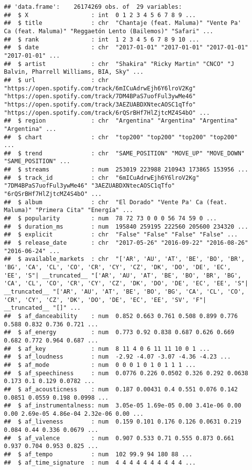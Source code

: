 \documentclass[
]{article}
\begin{document}
\begin{verbatim}
## 'data.frame':    26174269 obs. of  29 variables:
##  $ X                  : int  0 1 2 3 4 5 6 7 8 9 ...
##  $ title              : chr  "Chantaje (feat. Maluma)" "Vente Pa' Ca (feat. Maluma)" "Reggaetón Lento (Bailemos)" "Safari" ...
##  $ rank               : int  1 2 3 4 5 6 7 8 9 10 ...
##  $ date               : chr  "2017-01-01" "2017-01-01" "2017-01-01" "2017-01-01" ...
##  $ artist             : chr  "Shakira" "Ricky Martin" "CNCO" "J Balvin, Pharrell Williams, BIA, Sky" ...
##  $ url                : chr  "https://open.spotify.com/track/6mICuAdrwEjh6Y6lroV2Kg" "https://open.spotify.com/track/7DM4BPaS7uofFul3ywMe46" "https://open.spotify.com/track/3AEZUABDXNtecAOSC1qTfo" "https://open.spotify.com/track/6rQSrBHf7HlZjtcMZ4S4bO" ...
##  $ region             : chr  "Argentina" "Argentina" "Argentina" "Argentina" ...
##  $ chart              : chr  "top200" "top200" "top200" "top200" ...
##  $ trend              : chr  "SAME_POSITION" "MOVE_UP" "MOVE_DOWN" "SAME_POSITION" ...
##  $ streams            : num  253019 223988 210943 173865 153956 ...
##  $ track_id           : chr  "6mICuAdrwEjh6Y6lroV2Kg" "7DM4BPaS7uofFul3ywMe46" "3AEZUABDXNtecAOSC1qTfo" "6rQSrBHf7HlZjtcMZ4S4bO" ...
##  $ album              : chr  "El Dorado" "Vente Pa' Ca (feat. Maluma)" "Primera Cita" "Energía" ...
##  $ popularity         : num  78 72 73 0 0 0 56 74 59 0 ...
##  $ duration_ms        : num  195840 259195 222560 205600 234320 ...
##  $ explicit           : chr  "False" "False" "False" "False" ...
##  $ release_date       : chr  "2017-05-26" "2016-09-22" "2016-08-26" "2016-06-24" ...
##  $ available_markets  : chr  "['AR', 'AU', 'AT', 'BE', 'BO', 'BR', 'BG', 'CA', 'CL', 'CO', 'CR', 'CY', 'CZ', 'DK', 'DO', 'DE', 'EC', 'EE', 'S"| __truncated__ "['AR', 'AU', 'AT', 'BE', 'BO', 'BR', 'BG', 'CA', 'CL', 'CO', 'CR', 'CY', 'CZ', 'DK', 'DO', 'DE', 'EC', 'EE', 'S"| __truncated__ "['AR', 'AU', 'AT', 'BE', 'BO', 'BG', 'CA', 'CL', 'CO', 'CR', 'CY', 'CZ', 'DK', 'DO', 'DE', 'EC', 'EE', 'SV', 'F"| __truncated__ "[]" ...
##  $ af_danceability    : num  0.852 0.663 0.761 0.508 0.899 0.776 0.588 0.832 0.736 0.721 ...
##  $ af_energy          : num  0.773 0.92 0.838 0.687 0.626 0.669 0.682 0.772 0.964 0.687 ...
##  $ af_key             : num  8 11 4 0 6 11 11 10 0 1 ...
##  $ af_loudness        : num  -2.92 -4.07 -3.07 -4.36 -4.23 ...
##  $ af_mode            : num  0 0 0 1 0 1 0 1 1 1 ...
##  $ af_speechiness     : num  0.0776 0.226 0.0502 0.326 0.292 0.0638 0.173 0.1 0.129 0.0782 ...
##  $ af_acousticness    : num  0.187 0.00431 0.4 0.551 0.076 0.142 0.0851 0.0559 0.198 0.0998 ...
##  $ af_instrumentalness: num  3.05e-05 1.69e-05 0.00 3.41e-06 0.00 0.00 2.69e-05 4.86e-04 2.32e-06 0.00 ...
##  $ af_liveness        : num  0.159 0.101 0.176 0.126 0.0631 0.219 0.084 0.44 0.336 0.0679 ...
##  $ af_valence         : num  0.907 0.533 0.71 0.555 0.873 0.661 0.937 0.704 0.953 0.825 ...
##  $ af_tempo           : num  102 99.9 94 180 88 ...
##  $ af_time_signature  : num  4 4 4 4 4 4 4 4 4 4 ...
\end{verbatim}
\end{document}
